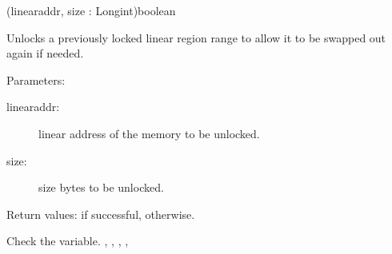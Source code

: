 {(linearaddr, size : Longint)}{boolean}
{Unlocks a previously locked linear region range to allow it to be swapped
out again if needed.

Parameters:
\begin{description}
\item[linearaddr:\ ] linear address of the memory to be unlocked. 
\item[size:\ ] size bytes to be unlocked.
\end{description}

Return values:  if successful,  otherwise.
}
{ Check the  variable.}{
,
,
,
,
}

